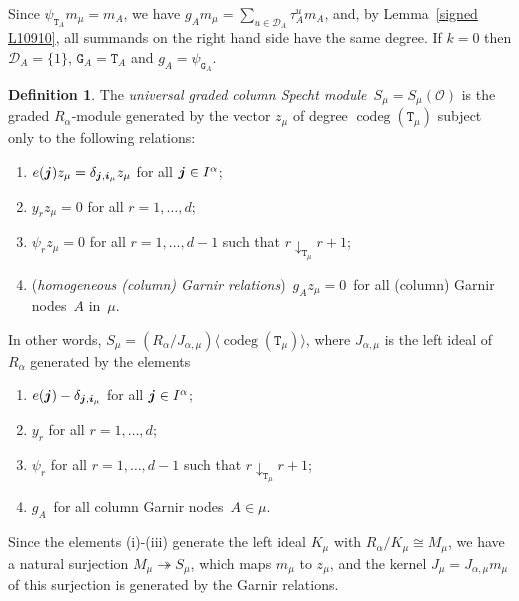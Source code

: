 \documentclass[twoside,11pt,reqno]{amsart}
\numberwithin{equation}{section}
\theoremstyle{definition}  %
\newtheorem{Definition}[equation]{Definition}
\let\<\langle
\let\>\rangle
\def\bi{\text{\boldmath$i$}}
\def\bj{\text{\boldmath$j$}}
\newcommand{\0}{{\bar 0}}
\newcommand{\1}{{\bar 1}}
\newcommand{\al}{\alpha}
\newcommand{\de}{\delta}
\newcommand{\D}{{\mathscr D}}
\newcommand\Par[1][]{{\mathscr P}^{\kappa#1}}
\def\T{{\mathtt T}}
\def\G{{\mathtt G}}
\def\codeg{\operatorname{codeg}}
\def\height{{\operatorname{ht}}}
\def\onto{{\twoheadrightarrow}}
\renewcommand\O{\mathcal O}
\begin{document}
Since $\psi_{\T_A}m_\mu=m_A$, we have 
$g_Am_\mu=\sum_{u\in\D_A}\tau^u_Am_A%
$, and, by Lemma~\ref{signed L10910}, all summands on the right hand side have  the same degree.  
If $k=0$ then $\D_A=\{1\}$, $\G_A=\T_A$ and $g_A=\psi_{\G_A}$. 

\begin{Definition} \label{signed Specht}%
The {\em universal graded column Specht module}\, $S_\mu=S_\mu(\O)$ is the graded $R_\al$-module generated  by the vector $z_\mu$ of degree $\codeg(\T_\mu)$ subject only to the following relations:
\begin{enumerate}
\item[{\rm (i)}] $e(\bj)z_\mu=\de_{\bj,\bi_\mu} z_\mu$ for all $\bj\in I^\al$;
\item[{\rm (ii)}] $y_rz_\mu=0$ for all $r=1,\dots,d$;
\item[{\rm (iii)}] $\psi_rz_\mu=0$ for all $r=1,\dots,d-1$ such that  $r\downarrow_{\T_\mu}  r+1$;
\item[{\rm (iv)}] ({\em homogeneous (column) Garnir relations})\, $g_A z_\mu=0$\, for all (column) Garnir nodes\, $A$ in~$\mu$. 
\end{enumerate}
In other words, $S_\mu= (R_\al/J_{\al,\mu})\<\codeg(\T_\mu)\>$, where $J_{\al,\mu}$ is the left ideal of $R_\al$ generated by the elements 
\begin{enumerate}
\item[{\rm (i)}] $e(\bj)-\de_{\bj,\bi_\mu}$ for all $\bj\in I^\al$;
\item[{\rm (ii)}] $y_r$ for all $r=1,\dots,d$;
\item[{\rm (iii)}] $\psi_r$ for all $r=1,\dots,d-1$ such that  $r\downarrow_{\T_\mu}  r+1$;
\item[{\rm (iv)}] $g_A$\, for all column Garnir nodes\, $A\in \mu$. 
\end{enumerate}
\end{Definition}

Since the elements (i)-(iii) generate the left ideal $K_{\mu}$ with $R_\al/K_{\mu}\cong M_\mu$,
we have a natural surjection $M_\mu\onto S_\mu$, which maps $m_\mu$ to $z_\mu$, and the kernel $J_\mu=J_{\al,\mu} m_\mu$ of this surjection is generated by the
Garnir relations. 

\end{document}
